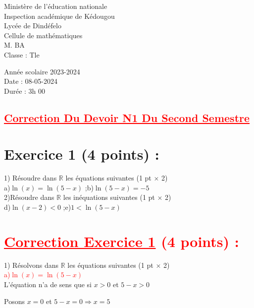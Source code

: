\documentclass[12pt]{article}
\begin{document}
\begin{minipage}{0.5\textwidth}
	Ministère de l'éducation nationale  \\
	Inspection académique de Kédougou   \\
	Lycée de Dindéfelo            \\
	Cellule de mathématiques            \\
	M. BA                          \\
	Classe : Tle  \\
\end{minipage}
\begin{minipage}{0.5\textwidth}
	Année scolaire 2023-2024 \\
	Date : 08-05-2024 \\
	Durée : 3h 00 \\
\end{minipage}

\begin{center}
	\section*{\textcolor{red}{\underline{Correction Du Devoir N1 Du Second Semestre}}}
\end{center}

\section*{Exercice 1 (4 points) :}
1) Résoudre dans $\mathbb{R}$ les équations suivantes  (1 pt $\times$ 2)\\
a)$\ln(x) = \ln(5-x)$ ;\quad\quad  b)$\ln(5-x)=-5$ \\
2)Résoudre dans $\mathbb{R}$ les inéquations suivantes (1 pt $\times$ 2)\\
d)$\ln(x-2)<0$ ;\quad\quad e)$1<\ln(5-x)$
\section*{\textcolor{red}{\underline{Correction Exercice 1} (4 points) :}}
1) Résolvons dans $\mathbb{R}$ les équations suivantes  (1 pt $\times$ 2)\\
\textcolor{red}{a)$\ln(x) = \ln(5-x)$}\\
L'équation n'a de sens que si $x>0$ et $5-x>0$

Posons $x=0$ et $5-x=0 \Rightarrow x=5$
\end{document}
